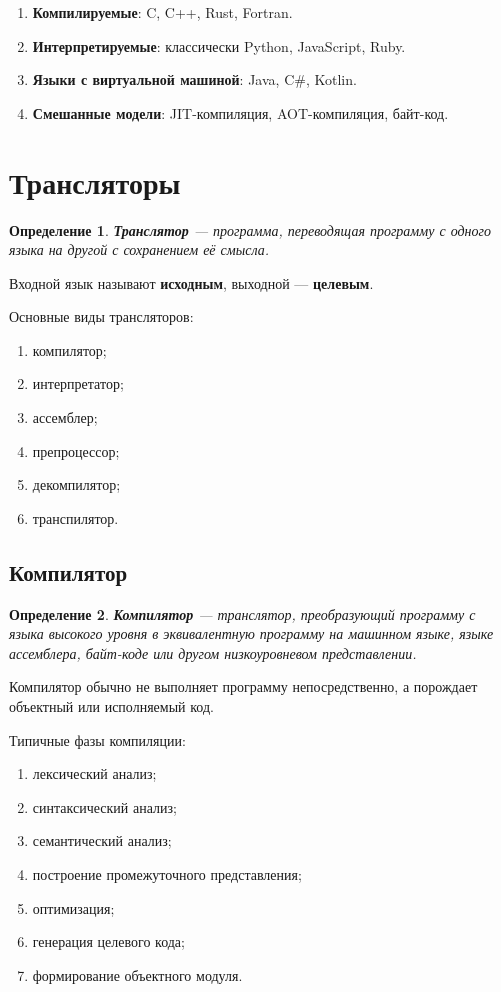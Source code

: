 \documentclass[12pt,a4paper]{article}
\newtheorem{definition}{Определение}
\begin{document}
\begin{enumerate}
  \item \textbf{Компилируемые}: C, C++, Rust, Fortran.
  \item \textbf{Интерпретируемые}: классически Python, JavaScript, Ruby.
  \item \textbf{Языки с виртуальной машиной}: Java, C\#, Kotlin.
  \item \textbf{Смешанные модели}: JIT-компиляция, AOT-компиляция, байт-код.
\end{enumerate}

\section{Трансляторы}

\begin{definition}
\textbf{Транслятор} --- программа, переводящая программу с одного языка на другой с сохранением её смысла.
\end{definition}

Входной язык называют \textbf{исходным}, выходной --- \textbf{целевым}.

Основные виды трансляторов:
\begin{enumerate}
  \item компилятор;
  \item интерпретатор;
  \item ассемблер;
  \item препроцессор;
  \item декомпилятор;
  \item транспилятор.
\end{enumerate}

\subsection{Компилятор}

\begin{definition}
\textbf{Компилятор} --- транслятор, преобразующий программу с языка высокого уровня в эквивалентную программу на машинном языке, языке ассемблера, байт-коде или другом низкоуровневом представлении.
\end{definition}

Компилятор обычно не выполняет программу непосредственно, а порождает объектный или исполняемый код.

Типичные фазы компиляции:
\begin{enumerate}
  \item лексический анализ;
  \item синтаксический анализ;
  \item семантический анализ;
  \item построение промежуточного представления;
  \item оптимизация;
  \item генерация целевого кода;
  \item формирование объектного модуля.
\end{enumerate}
\end{document}
